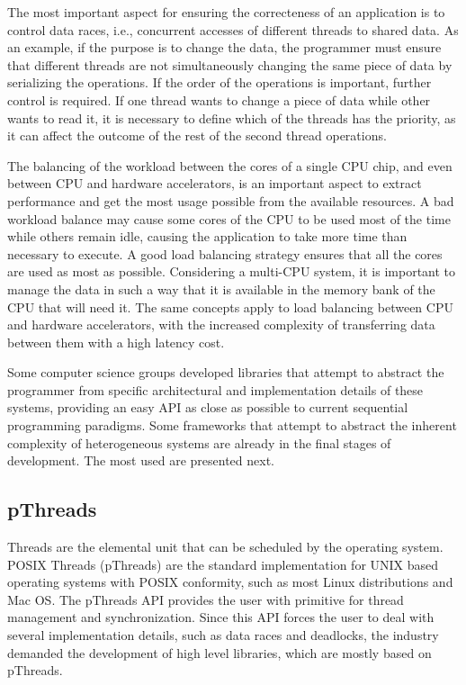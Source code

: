 The most important aspect for ensuring the correcteness of an application is to control data races, i.e., concurrent accesses of different threads to shared data. As an example, if the purpose is to change the data, the programmer must ensure that different threads are not simultaneously changing the same piece of data by serializing the operations. If the order of the operations is important, further control is required. If one thread wants to change a piece of data while other wants to read it, it is necessary to define which of the threads has the priority, as it can affect the outcome of the rest of the second thread operations.

The balancing of the workload between the cores of a single CPU chip, and even between CPU and hardware accelerators, is an important aspect to extract performance and get the most usage possible from the available resources. A bad workload balance may cause some cores of the CPU to be used most of the time while others remain idle, causing the application to take more time than necessary to execute. A good load balancing strategy ensures that all the cores are used as most as possible. Considering a multi-CPU system, it is important to manage the data in such a way that it is available in the memory bank of the CPU that will need it. The same concepts apply to load balancing between CPU and hardware accelerators, with the increased complexity of transferring data between them with a high latency cost.

Some computer science groups developed libraries that attempt to abstract the programmer from specific architectural and implementation details of these systems, providing an easy API as close as possible to current sequential programming paradigms. Some frameworks that attempt to abstract the inherent complexity of heterogeneous systems are already in the final stages of development. The most used are presented next.

\subsection{pThreads}
\label{pThreads}

Threads are the elemental unit that can be scheduled by the operating system. POSIX Threads (pThreads) are the standard implementation for UNIX based operating systems with POSIX conformity, such as most Linux distributions and Mac OS. The pThreads API provides the user with primitive for thread management and synchronization. Since this API forces the user to deal with several implementation details, such as data races and deadlocks, the industry demanded the development of high level libraries, which are mostly based on pThreads.


